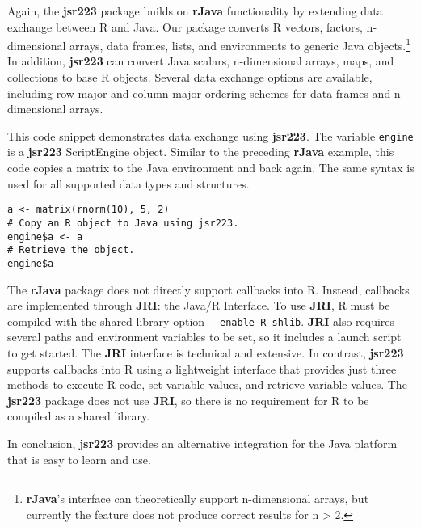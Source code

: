 Again, the \textbf{jsr223} package builds on \textbf{rJava} functionality by extending data exchange between R and Java. Our package converts R vectors, factors, n-dimensional arrays, data frames, lists, and environments to generic Java objects.\footnote{\textbf{rJava}'s interface can theoretically support n-dimensional arrays, but currently the feature does not produce correct results for n > 2.} In addition, \textbf{jsr223} can convert Java scalars, n-dimensional arrays, maps, and collections to base R objects. Several data exchange options are available, including row-major and column-major ordering schemes for data frames and n-dimensional arrays. %

This code snippet demonstrates data exchange using \textbf{jsr223}. The variable \texttt{engine} is a \textbf{jsr223} ScriptEngine object. Similar to the preceding \textbf{rJava} example, this code copies a matrix to the Java environment and back again. The same syntax is used for all supported data types and structures.

\begin{verbatim}
a <- matrix(rnorm(10), 5, 2)
# Copy an R object to Java using jsr223.
engine$a <- a
# Retrieve the object.
engine$a
\end{verbatim}

The \textbf{rJava} package does not directly support callbacks into R. Instead, callbacks are implemented through \textbf{JRI}: the Java/R Interface. To use \textbf{JRI}, R must be compiled with the shared library option \texttt{-{}-enable-R-shlib}. \textbf{JRI} also requires several paths and environment variables to be set, so it includes a launch script to get started. The \textbf{JRI} interface is technical and extensive. In contrast, \textbf{jsr223} supports callbacks into R using a lightweight interface that provides just three methods to execute R code, set variable values, and retrieve variable values. The \textbf{jsr223} package does not use \textbf{JRI}, so there is no requirement for R to be compiled as a shared library.

In conclusion, \textbf{jsr223} provides an alternative integration for the Java platform that is easy to learn and use.
